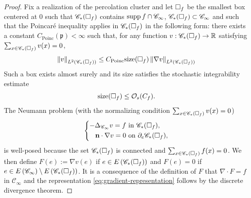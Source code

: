 \documentclass[12pt]{amsart}
\numberwithin{equation}{section}
\begin{document}
	
	\begin{proof}
		Fix a realization of the percolation cluster and let $\square_f$ be the smallest box centered at $0$ such that $\mathscr{C}_*(\square_f)$ contains $\mathrm{supp\,} f \cap \mathscr{C}_\infty$, $\mathscr{C}_*(\square_f) \subset \mathscr{C}_{\infty}$ and such that the Poincar\'e inequality applies in $\mathscr{C}_*(\square_f)$ in the following form: there exists a constant $C_{\mathrm{Poinc}}( \mathfrak{p}) < \infty$ such that, for any function $v : \mathscr{C}_*(\square_f) \to \operatorname{\mathbb{R}}$ satisfying $\sum_{x \in \mathscr{C}_*(\square_f)} v(x) = 0$,
		\begin{equation*}
			\left\| v \right\|_{L^2 ( \mathscr{C}_*(\square_f) )} \leq C_{\mathrm{Poinc}} \mathrm{size}(\square_f) \left\| \nabla v \right\|_{L^2 ( \mathscr{C}_*(\square_f))}
		\end{equation*}
		Such a box exists almost surely and its size satisfies the stochastic integrability estimate
		\begin{equation} \label{eq:bound-on-size}
			\mathrm{size}(\square_f)  \leq \mathcal{O}_s(C_f). 
		\end{equation}
		The Neumann problem (with the normalizing condition $\sum_{x \in \mathscr{C}_*(\square_f)} v(x) = 0$)
		\begin{equation} \label{eq:Neumannprob}
			\left\{ 
			\begin{aligned}
				- \Delta_{\mathscr{C}_\infty} v = f &~\mbox{in}~ \mathscr{C}_* (\square_f), \\
				\mathbf{n} \cdot \nabla v = 0 &~\mbox{on} ~ \partial_e \mathscr{C}_*(\square_f),
			\end{aligned}
			\right.
		\end{equation}
		is well-posed because the set $\mathscr{C}_*(\square_f)$ is connected and $\sum_{x \in \mathscr{C}_*(\square_f)} f(x) = 0$. We then define $F(e) := \nabla v(e)$ if $e \in E \left(\mathscr{C}_*(\square_f)\right)$ and $F(e) = 0$ if $e \in E \left( \mathscr{C}_\infty \right)  \setminus E \left(\mathscr{C}_*(\square_f)\right)$. It is a consequence of the definition of $F$ that $\nabla \cdot F = f$ in $\mathscr{C}_\infty$
		and the representation \eqref{eq:gradient-representation} follows by the discrete divergence theorem. 
		

\end{proof}
\end{document}
